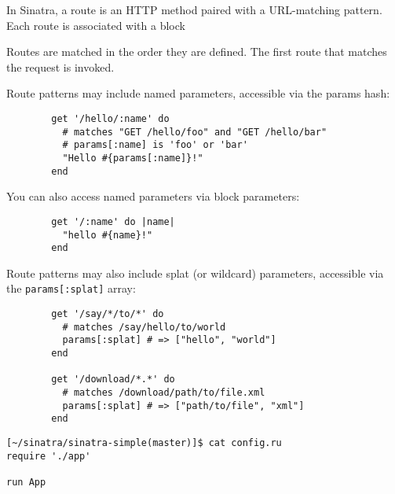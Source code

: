 In Sinatra, a route is an HTTP method paired with a URL-matching
pattern. Each route is associated with a block

Routes are matched in the order they are defined. The first route
that matches the request is invoked.

Route patterns may include named parameters, accessible via the params hash:

\begin{verbatim}        get '/hello/:name' do
          # matches "GET /hello/foo" and "GET /hello/bar"
          # params[:name] is 'foo' or 'bar'
          "Hello #{params[:name]}!"
        end
\end{verbatim}

You can also access named parameters via block parameters:

\begin{verbatim}        get '/:name' do |name|
          "hello #{name}!"
        end
\end{verbatim}

Route patterns may also include splat (or wildcard) parameters,
accessible via the {\tt params[:splat]} array:

\begin{verbatim}        get '/say/*/to/*' do
          # matches /say/hello/to/world
          params[:splat] # => ["hello", "world"]
        end

        get '/download/*.*' do
          # matches /download/path/to/file.xml
          params[:splat] # => ["path/to/file", "xml"]
        end
\end{verbatim}

\begin{verbatim}
[~/sinatra/sinatra-simple(master)]$ cat config.ru 
require './app'

run App
\end{verbatim}

